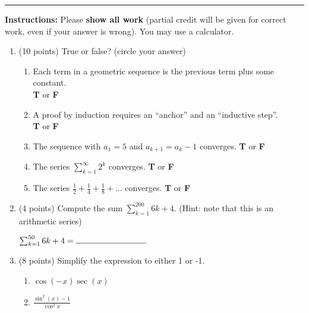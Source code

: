 \documentclass[11pt]{article}
\begin{document}
\Large

\medskip\hrule
\vspace{10pt}

\noindent \textbf{Instructions:} Please \textbf{show all work} (partial credit will be given for correct work, even if your answer is wrong). You may use a calculator.

\begin{enumerate}

\item (10 points) True or false? (circle your answer)
\begin{enumerate}[itemsep=20pt, label={\alph*)}]
\item Each term in a geometric sequence is the previous term plus some constant.  \\ \null\hfill \textbf{T} or \textbf{F}
\item A proof by induction requires an ``anchor'' and an ``inductive step''.\\ \null\hfill \textbf{T} or \textbf{F}
\item The sequence with $a_1 = 5$ and $a_{k+1} = a_k - 1$ converges. \null\hfill \textbf{T} or \textbf{F}

\item The series $\sum_{k=1}^{\infty} 2^k$ converges. \null\hfill \textbf{T} or \textbf{F}
\item The series $\frac{1}{2}+ \frac{1}{4}+ \frac{1}{8}+...$ converges. \null\hfill \textbf{T} or \textbf{F}
\end{enumerate}

\vspace{20pt}
\item (4 points) Compute the sum $\sum_{k=1}^{200} 6k+4$. (Hint: note that this is an arithmetic series)

\vspace{120pt}
\begin{flushright}
$\sum_{k=1}^{50} 6k+4 = \rule{3cm}{0.4pt}$
\end{flushright}

\newpage

\item (8 points) Simplify the expression to either 1 or -1.

\begin{enumerate}[itemsep=80pt, label={\alph*)}]
    \item $\displaystyle \cos(-x) \sec(x) $
    \item $\displaystyle \frac{\sin^2(x)-1}{\cos^2x} $
\end{enumerate}


\end{enumerate}
\end{document}

